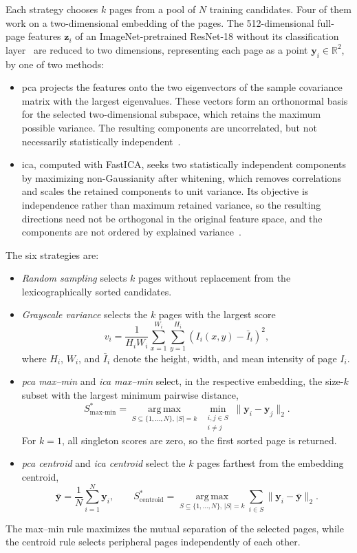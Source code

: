 Each strategy chooses \(k\) pages from a pool of \(N\) training candidates. Four of them work on a two-dimensional embedding of the pages. The 512-dimensional full-page features \(\mathbf{z}_i\) of an ImageNet-pretrained ResNet-18 without its classification layer~\cite{He_2016_CVPR} are reduced to two dimensions, representing each page as a point \(\mathbf{y}_i \in \mathbb{R}^2\), by one of two methods:
\begin{itemize}
    \item \Gls{pca} projects the features onto the two eigenvectors of the sample covariance matrix with the largest eigenvalues. These vectors form an orthonormal basis for the selected two-dimensional subspace, which retains the maximum possible variance. The resulting components are uncorrelated, but not necessarily statistically independent~\cite{Jolliffe2016PCA}.
    \item \Gls{ica}, computed with FastICA, seeks two statistically independent components by maximizing non-Gaussianity after whitening, which removes correlations and scales the retained components to unit variance. Its objective is independence rather than maximum retained variance, so the resulting directions need not be orthogonal in the original feature space, and the components are not ordered by explained variance~\cite{Hyvarinen1999FastICA}.
\end{itemize}
The six strategies are:
\begin{itemize}
    \item \emph{Random sampling} selects \(k\) pages without replacement from the lexicographically sorted candidates.
    \item \emph{Grayscale variance} selects the \(k\) pages with the largest score
    \[
        v_i = \frac{1}{H_i W_i}
        \sum_{x=1}^{W_i}\sum_{y=1}^{H_i}
        \left(I_i(x,y)-\bar{I}_i\right)^2,
    \]
    where \(H_i\), \(W_i\), and \(\bar{I}_i\) denote the height, width, and mean intensity of page \(I_i\).
    \item \emph{\gls{pca} max--min} and \emph{\gls{ica} max--min} select, in the respective embedding, the size-\(k\) subset with the largest minimum pairwise distance,
    \[
        S_{\mathrm{max\text{-}min}}^{*}
        = \underset{S \subseteq \{1,\ldots,N\},\,|S|=k}{\operatorname{arg\,max}}
          \;\underset{\substack{i,j\in S\\i\neq j}}{\operatorname{min}}
          \lVert \mathbf{y}_i-\mathbf{y}_j \rVert_2.
    \]
    For \(k=1\), all singleton scores are zero, so the first sorted page is returned.
    \item \emph{\gls{pca} centroid} and \emph{\gls{ica} centroid} select the \(k\) pages farthest from the embedding centroid,
    \[
        \bar{\mathbf{y}} = \frac{1}{N}\sum_{i=1}^{N}\mathbf{y}_i,
        \qquad
        S_{\mathrm{centroid}}^{*}
        = \underset{S \subseteq \{1,\ldots,N\},\,|S|=k}{\operatorname{arg\,max}}
          \sum_{i\in S}\lVert\mathbf{y}_i-\bar{\mathbf{y}}\rVert_2.
    \]
\end{itemize}
The max--min rule maximizes the mutual separation of the selected pages, while the centroid rule selects peripheral pages independently of each other.

